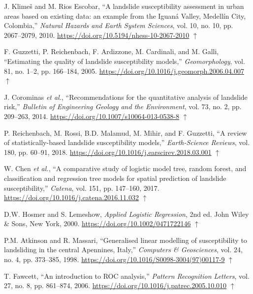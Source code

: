 \documentclass[letterpaper,11pt]{tec}
\begin{document}
{\begin{thebibliography}{}
 J. Klimeš and M. Rios Escobar, ``A landslide susceptibility assessment in urban areas based on existing data: an example from the Iguaná Valley, Medellín City, Colombia,'' {\it Natural Hazards and Earth System Sciences}, vol. 10, no. 10, pp. 2067--2079, 2010.
\url{https://doi.org/10.5194/nhess-10-2067-2010}
$\uparrow$\par

 F. Guzzetti, P. Reichenbach, F. Ardizzone, M. Cardinali, and M. Galli, ``Estimating the quality of landslide susceptibility models,'' {\it Geomorphology}, vol. 81, no. 1--2, pp. 166--184, 2005.
\url{https://doi.org/10.1016/j.geomorph.2006.04.007}
$\uparrow$\par

 J. Corominas {\it et al.}, ``Recommendations for the quantitative analysis of landslide risk,'' {\it Bulletin of Engineering Geology and the Environment}, vol. 73, no. 2, pp. 209--263, 2014.
\url{https://doi.org/10.1007/s10064-013-0538-8}
$\uparrow$\par

 P. Reichenbach, M. Rossi, B.D. Malamud, M. Mihir, and F. Guzzetti, ``A review of statistically-based landslide susceptibility models,'' {\it Earth-Science Reviews}, vol. 180, pp. 60--91, 2018.
\url{https://doi.org/10.1016/j.earscirev.2018.03.001}
$\uparrow$\par

 W. Chen {\it et al.}, ``A comparative study of logistic model tree, random forest, and classification and regression tree models for spatial prediction of landslide susceptibility,'' {\it Catena}, vol. 151, pp. 147--160, 2017.
\url{https://doi.org/10.1016/j.catena.2016.11.032}
$\uparrow$\par

 D.W. Hosmer and S. Lemeshow, {\it Applied Logistic Regression}, 2nd ed. John Wiley \& Sons, New York, 2000.
\url{https://doi.org/10.1002/0471722146}
$\uparrow$\par

 P.M. Atkinson and R. Massari, ``Generalised linear modelling of susceptibility to landsliding in the central Apennines, Italy,'' {\it Computers \& Geosciences}, vol. 24, no. 4, pp. 373--385, 1998.
\url{https://doi.org/10.1016/S0098-3004(97)00117-9}
$\uparrow$\par

 T. Fawcett, ``An introduction to ROC analysis,'' {\it Pattern Recognition Letters}, vol. 27, no. 8, pp. 861--874, 2006.
\url{https://doi.org/10.1016/j.patrec.2005.10.010}
$\uparrow$\par


\end{thebibliography}}
\end{document}
